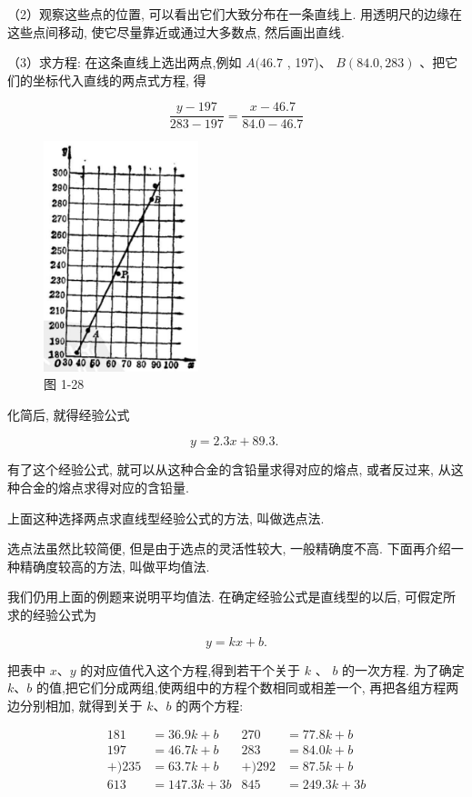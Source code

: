\documentclass[lang=cn,newtx,10pt,scheme=chinese]{elegantbook}
\begin{document}
（2）观察这些点的位置, 可以看出它们大致分布在一条直线上. 用透明尺的边缘在这些点间移动, 使它尽量靠近或通过大多数点, 然后画出直线.

（3）求方程: 在这条直线上选出两点,例如 \(A({46.7}\) , 197)、 \(B\left( {{84.0},{283}}\right)\) 、把它们的坐标代入直线的两点式方程, 得

\[
  \frac{y - {197}}{{283} - {197}} = \frac{x - {46.7}}{{84.0} - {46.7}}
\]

\begin{figure}[h]
  \centering
  \includegraphics[max width=0.4\textwidth]{images/01912cc2-ffb6-728e-9ae7-b113ff05c64b_37_976668.jpg}
  \caption{图 1-28}
\end{figure}



化简后, 就得经验公式

\[
  y = {2.3x} + {89.3}\text{. }
\]

有了这个经验公式, 就可以从这种合金的含铅量求得对应的熔点, 或者反过来, 从这种合金的熔点求得对应的含铅量.

上面这种选择两点求直线型经验公式的方法, 叫做选点法.

选点法虽然比较简便, 但是由于选点的灵活性较大, 一般精确度不高. 下面再介绍一种精确度较高的方法, 叫做平均值法.

我们仍用上面的例题来说明平均值法. 在确定经验公式是直线型的以后, 可假定所求的经验公式为

\[
  y = {kx} + b.
\]

把表中 \(x\text{、}y\) 的对应值代入这个方程,得到若干个关于 \(k\) 、 \(b\) 的一次方程. 为了确定 \(k\text{、}b\) 的值,把它们分成两组,使两组中的方程个数相同或相差一个, 再把各组方程两边分别相加, 就得到关于 \(k\text{、}b\) 的两个方程:

\[
  \begin{aligned} {181} & = {36.9k} + b & {270} & = {77.8k} + b \\ {197} & = {46.7k} + b & {283} & = {84.0k} + b \\ + ){235} & = {63.7k} + b & + ){292} & = {87.5k} + b \\ {613} & = {147.3k} + {3b} & {845} & = {249.3k} + {3b} \end{aligned}
\]
\end{document}
